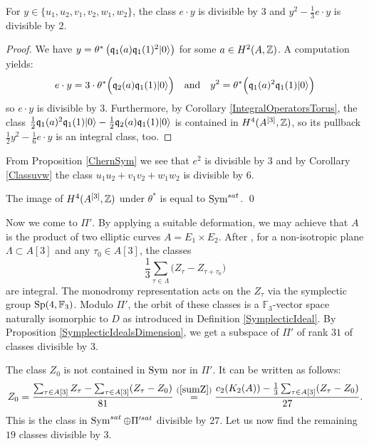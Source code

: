 \begin{proposition}\label{classedivisibleSym}
For $y\in\{u_1,u_2,v_1,v_2,w_1,w_2\}$, the class
$
e \cdot y
$
is divisible by $3$ and 
$
 y^2 - \frac{1}{3} e\cdot y
$
is divisible by $2$.
\end{proposition}
\begin{proof}
We have $y= \theta^*\left(\mathfrak{q}_1(a)\mathfrak{q}_1(1)^2|0\rangle\right)$ for some $a\in H^2(A,\mathbb{Z})$. A computation yields:
$$
e\cdot y = 3\cdot \theta^*\Big( \mathfrak{q}_2(a)\mathfrak{q}_1(1)|0\rangle \Big)
\quad \text{and}\quad
y^2 = \theta^*\Big(\mathfrak{q}_1(a)^2\mathfrak{q}_1(1)|0\rangle\Big)
$$
so $e\cdot y$ is divisible by $3$. Furthermore, by Corollary \ref{IntegralOperatorsTorus}, the class 
$
\frac{1}{2} \mathfrak{q}_1(a)^2\mathfrak{q}_1(1)|0\rangle - \frac{1}{2} \mathfrak{q}_2(a)\mathfrak{q}_1(1)|0\rangle 
$
is contained in $H^4(A^{[3]},\mathbb{Z})$, so its pullback
$
 \frac{1}{2}y^2 - \frac{1}{6} e\cdot y
$
is an integral class, too.
\end{proof}
From Proposition \ref{ChernSym} we see that
$e^2$ is divisible by $3$ and by Corollary \ref{Classuvw}
the class $u_1u_2 + v_1v_2+w_1w_2$ is divisible by 6.
\begin{corollary}\label{SymSatImage}
The image of $H^4(A^{[3]},\mathbb{Z})$ under $\theta^*$ is equal to $\operatorname{Sym}^{sat}$. \qed
\end{corollary}
Now we come to $\Pi'$. By applying a suitable deformation, we may achieve that $A$ is the product of two elliptic curves $A=E_1\times E_2$. After \cite[Eq.~(12)]{Hassett}, for a non-isotropic plane $\Lambda \subset A[3]$ and any $\tau_0\in A[3]$, the classes 
\begin{equation}
 \frac{1}{3}\sum_{\tau\in\Lambda} \Big(Z_{\tau} - Z_{\tau+\tau_0}\Big)
\end{equation}
are integral. The monodromy representation acts on the $Z_\tau$ via the symplectic group $\operatorname{Sp}(4,\mathbb F_3)$. Modulo $\Pi'$, the orbit of these classes is a $\mathbb F_3$-vector space naturally isomorphic to $D$ as introduced in Definition \ref{SymplecticIdeal}. By Proposition \ref{SymplecticIdealsDimension}, we get a subspace of $\Pi'$ of rank $31$ of classes divisible by $3$.

The class $Z_0$ is not contained in $\operatorname{Sym}$ nor in $\Pi'$.
It can be written as follows:
$$
Z_0=\frac{\sum_{\tau\in A[3]}Z_\tau-\sum_{\tau\in A[3]}(Z_\tau-Z_0)}{81}
\stackrel{(\ref{sumZ})}{=} \frac{c_2(K_2(A))-\frac{1}{3}\sum_{\tau\in A[3]}(Z_\tau-Z_0)}{27}.
$$
This is the class in $\operatorname{Sym}^{sat}\oplus \Pi'^{sat}$ divisible by $27$. Let us now find the remaining $19$ classes divisible by $3$.


